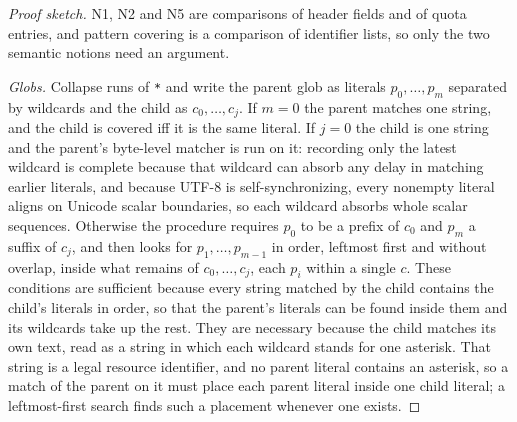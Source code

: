 \documentclass[10pt,twocolumn]{article}
\theoremstyle{plain}
\theoremstyle{definition}
\begin{document}
\begin{proof}[Proof sketch]
N1, N2 and N5 are comparisons of header fields and of quota entries, and pattern covering is a comparison of identifier lists, so only the two semantic notions need an argument.

\emph{Globs.} Collapse runs of \texttt{*} and write the parent glob as literals $p_0, \dots, p_m$ separated by wildcards and the child as $c_0, \dots, c_j$. If $m = 0$ the parent matches one string, and the child is covered iff it is the same literal. If $j = 0$ the child is one string and the parent's byte-level matcher is run on it: recording only the latest wildcard is complete because that wildcard can absorb any delay in matching earlier literals, and because UTF-8 is self-synchronizing, every nonempty literal aligns on Unicode scalar boundaries, so each wildcard absorbs whole scalar sequences. Otherwise the procedure requires $p_0$ to be a prefix of $c_0$ and $p_m$ a suffix of $c_j$, and then looks for $p_1, \dots, p_{m-1}$ in order, leftmost first and without overlap, inside what remains of $c_0, \dots, c_j$, each $p_i$ within a single $c$. These conditions are sufficient because every string matched by the child contains the child's literals in order, so that the parent's literals can be found inside them and its wildcards take up the rest. They are necessary because the child matches its own text, read as a string in which each wildcard stands for one asterisk. That string is a legal resource identifier, and no parent literal contains an asterisk, so a match of the parent on it must place each parent literal inside one child literal; a leftmost-first search finds such a placement whenever one exists.


\end{proof}
\end{document}
